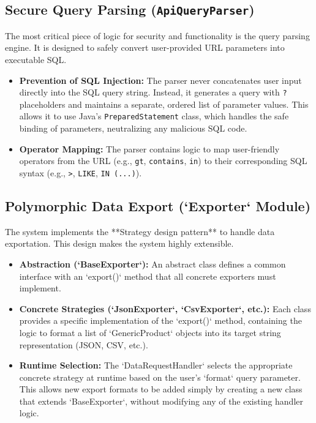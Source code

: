 \documentclass[12pt, a4paper]{report}
\begin{document}
\subsection{Secure Query Parsing (\lstinline|ApiQueryParser|)}
The most critical piece of logic for security and functionality is the query parsing engine. It is designed to safely convert user-provided URL parameters into executable SQL.

\begin{itemize}
    \item \textbf{Prevention of SQL Injection:} The parser never concatenates user input directly into the SQL query string. Instead, it generates a query with \lstinline|?| placeholders and maintains a separate, ordered list of parameter values. This allows it to use Java's \lstinline|PreparedStatement| class, which handles the safe binding of parameters, neutralizing any malicious SQL code.


    \item \textbf{Operator Mapping:} The parser contains logic to map user-friendly operators from the URL (e.g., \lstinline|gt|, \lstinline|contains|, \lstinline|in|) to their corresponding SQL syntax (e.g., \lstinline|>|, \lstinline|LIKE|, \lstinline|IN (...)|).
\end{itemize}

\subsection{Polymorphic Data Export (`Exporter` Module)}
The system implements the **Strategy design pattern** to handle data exportation. This design makes the system highly extensible.
\begin{itemize}
    \item \textbf{Abstraction (`BaseExporter`):} An abstract class defines a common interface with an `export()` method that all concrete exporters must implement.
    \item \textbf{Concrete Strategies (`JsonExporter`, `CsvExporter`, etc.):} Each class provides a specific implementation of the `export()` method, containing the logic to format a list of `GenericProduct` objects into its target string representation (JSON, CSV, etc.).
    \item \textbf{Runtime Selection:} The `DataRequestHandler` selects the appropriate concrete strategy at runtime based on the user's `format` query parameter. This allows new export formats to be added simply by creating a new class that extends `BaseExporter`, without modifying any of the existing handler logic.
\end{itemize}
\end{document}
